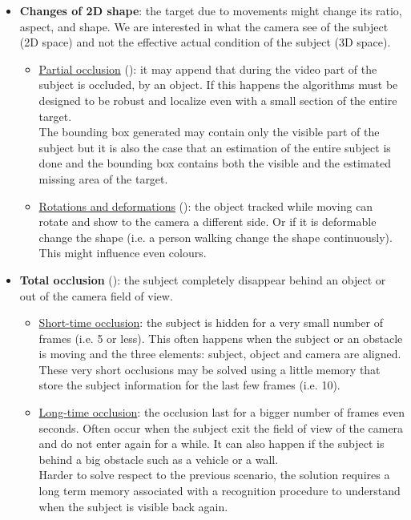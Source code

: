 \begin{itemize}
	\item \textbf{Changes of 2D shape}: the target due to movements might change its ratio, aspect, and shape. We are interested in what the camera see of the subject (2D  space) and not the effective actual condition of the subject (3D space).
	\begin{itemize}
		\item \underline{Partial occlusion} (): it may append that during the video part of the subject is occluded, by an object. If this happens the algorithms must be designed to be robust and localize even with a small section of the entire target.\\
		The bounding box generated may contain only the visible part of the subject but it is also the case that an estimation of the entire subject is done and the bounding box contains both the visible and the estimated missing area of the target.
		\item \underline{Rotations and deformations} (): the object tracked while moving can rotate and show to the camera a different side. Or if it is deformable change the shape (i.e. a person walking change the shape continuously). This might influence even colours.
	\end{itemize}
	
	\item \textbf{Total occlusion} (): the subject completely disappear behind an object or out of the camera field of view.
	\begin{itemize}
		\item \underline{Short-time occlusion}: the subject is hidden for a very small number of frames (i.e. 5 or less). This often happens when the subject or an obstacle is moving and the three elements: subject, object and camera are aligned. These very short occlusions may be solved using a little memory that store the subject information for the last few frames (i.e. 10).
		\item \underline{Long-time  occlusion}: the occlusion last for a bigger number of frames even seconds. Often occur when the subject exit the field of view of the camera and do not enter again for a while. It can also happen if the subject is behind a big obstacle such as a vehicle or a wall.\\
		Harder to solve respect to the previous scenario, the solution requires a long term memory associated with a recognition procedure to understand when the subject is visible back again.
	\end{itemize}


\end{itemize}
